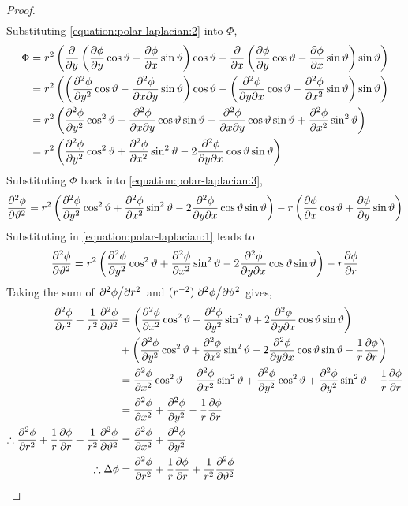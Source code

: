 \begin{lemma}
\begin{proof}
\begin{align}
        \end{align}
        Substituting \eqref{equation:polar-laplacian:2} into $\Phi$,
        \begin{align*}
            \Phi&=r^2\left(\pdv{y}\left(\pdv{\phi}{y}\cos\vartheta-\pdv{\phi}{x}\sin\vartheta\right)\cos\vartheta-\pdv{x}\left(\pdv{\phi}{y}\cos\vartheta-\pdv{\phi}{x}\sin\vartheta\right)\sin\vartheta\right)\\
            &=r^2\left(\left(\pdv[2]{\phi}{y}\cos\vartheta-\pdv{\phi}{x}{y}\sin\vartheta\right)\cos\vartheta-\left(\pdv{\phi}{y}{x}\cos\vartheta-\pdv[2]{\phi}{x}\sin\vartheta\right)\sin\vartheta\right)\\
            &=r^2\left(\pdv[2]{\phi}{y}\cos^2\vartheta-\pdv{\phi}{x}{y}\cos\vartheta\sin\vartheta-\pdv{\phi}{x}{y}\cos\vartheta\sin\vartheta+\pdv[2]{\phi}{x}\sin^2\vartheta\right)\\
            &=r^2\left(\pdv[2]{\phi}{y}\cos^2\vartheta+\pdv[2]{\phi}{x}\sin^2\vartheta-2\pdv{\phi}{y}{x}\cos\vartheta\sin\vartheta\right)
        \end{align*}
        Substituting $\Phi$ back into \eqref{equation:polar-laplacian:3},
        $$
            \pdv[2]{\phi}{\vartheta}=r^2\left(\pdv[2]{\phi}{y}\cos^2\vartheta+\pdv[2]{\phi}{x}\sin^2\vartheta-2\pdv{\phi}{y}{x}\cos\vartheta\sin\vartheta\right)-r\left(\pdv{\phi}{x}\cos\vartheta+\pdv{\phi}{y}\sin\vartheta\right)
        $$
        Substituting in \eqref{equation:polar-laplacian:1} leads to
        $$
            \pdv[2]{\phi}{\vartheta}=r^2\left(\pdv[2]{\phi}{y}\cos^2\vartheta+\pdv[2]{\phi}{x}\sin^2\vartheta-2\pdv{\phi}{y}{x}\cos\vartheta\sin\vartheta\right)-r\pdv{\phi}{r}
        $$
        Taking the sum of $\pdv*[2]{\phi}{r}$ and $(r^{-2})\pdv*[2]{\phi}{\vartheta}$ gives,
        \begin{align*}
            \pdv[2]{\phi}{r}+\frac{1}{r^2}\pdv[2]{\phi}{\vartheta}&=\left(\pdv[2]{\phi}{x}\cos^2\vartheta+\pdv[2]{\phi}{y}\sin^2\vartheta+2\pdv{\phi}{y}{x}\cos\vartheta\sin\vartheta\right)\\
            &+\left(\pdv[2]{\phi}{y}\cos^2\vartheta+\pdv[2]{\phi}{x}\sin^2\vartheta-2\pdv{\phi}{y}{x}\cos\vartheta\sin\vartheta-\frac{1}{r}\pdv{\phi}{r}\right)\\
            &=\pdv[2]{\phi}{x}\cos^2\vartheta+\pdv[2]{\phi}{x}\sin^2\vartheta+\pdv[2]{\phi}{y}\cos^2\vartheta+\pdv[2]{\phi}{y}\sin^2\vartheta-\frac{1}{r}\pdv{\phi}{r}\\
            &=\pdv[2]{\phi}{x}+\pdv[2]{\phi}{y}-\frac{1}{r}\pdv{\phi}{r}\\
            \therefore\pdv[2]{\phi}{r}+\frac{1}{r}\pdv{\phi}{r}+\frac{1}{r^2}\pdv[2]{\phi}{\vartheta}&=\pdv[2]{\phi}{x}+\pdv[2]{\phi}{y}\\
            \therefore\Delta\phi&=\pdv[2]{\phi}{r}+\frac{1}{r}\pdv{\phi}{r}+\frac{1}{r^2}\pdv[2]{\phi}{\vartheta}
        \end{align*}
    \end{proof}
\end{lemma}

